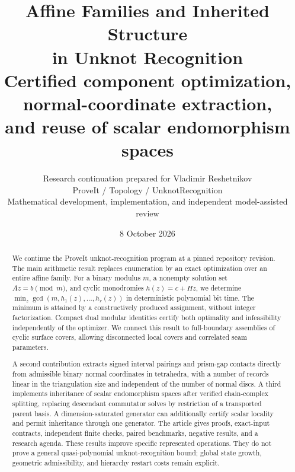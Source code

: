 \documentclass[11pt,letterpaper]{article}
\title{\color{ink}\textbf{Affine Families and Inherited Structure\\in Unknot Recognition}\\[6pt]
  \large Certified component optimization, normal-coordinate extraction,\\
  and reuse of scalar endomorphism spaces}
\author{Research continuation prepared for Vladimir Reshetnikov\\
  \small ProveIt / Topology / UnknotRecognition\\
  \small Mathematical development, implementation, and independent model-assisted review}
\date{8 October 2026}
\theoremstyle{definition}
\begin{document}
\maketitle
\begin{abstract}
We continue the ProveIt unknot-recognition program at a pinned repository
revision. The main arithmetic result replaces enumeration by an exact
optimization over an entire affine family. For a binary modulus $m$, a
nonempty solution set $Az=b\pmod m$, and cyclic monodromies
$h(z)=c+Hz$, we determine
$\min_z\gcd(m,h_1(z),\ldots,h_r(z))$ in deterministic polynomial bit time.
The minimum is attained by a constructively produced assignment, without
integer factorization. Compact dual modular identities certify both
optimality and infeasibility independently of the optimizer. We connect
this result to full-boundary assemblies of cyclic surface covers, allowing
disconnected local covers and correlated seam parameters.

A second contribution extracts signed interval pairings and prism-gap
contacts directly from admissible binary normal coordinates in tetrahedra,
with a number of records linear in the triangulation size and independent
of the number of normal discs. A third implements inheritance of scalar
endomorphism spaces after verified chain-complex splitting, replacing
descendant commutator solves by restriction of a transported parent basis.
A dimension-saturated generator can additionally certify scalar locality
and permit inheritance through one generator. The article gives proofs, exact-input contracts, independent finite
checks, paired benchmarks, negative results, and a research agenda.
These results improve specific represented operations. They do not prove
a general quasi-polynomial unknot-recognition bound; global state growth,
geometric admissibility, and hierarchy restart costs remain explicit.
\end{abstract}
\clearpage
\tableofcontents
\clearpage












\end{document}
